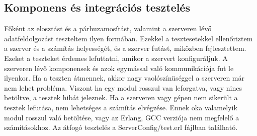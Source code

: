 \subsection{Komponens és integrációs tesztelés}
	Főként az elosztást és a párhuzamosítást, valamint a szerveren lévő adatfeldolgozást teszteltem ilyen formában. Ezekkel a tesztesetekkel ellenőriztem a szerver és a számítás helyességét, és a szerver futást, miközben fejlesztettem.\newline
	Ezeket a teszteket érdemes lefuttatni, amikor a szervert konfiguráljuk. A szerveren lévő komponensek és azok egymással való kommunikációja fut le ilyenkor. Ha a teszten átmennek, akkor nagy vaolószínüséggel a szerveren már nem lehet probléma.\newline
	Viszont ha egy modul rosszul van leforgatva, vagy nincs betöltve, a tesztek hibát jeleznek. Ha a szerveren vagy gépen nem sikerült a tesztek lefutása, nem lehetséges a számítás elvégzése. Ennek oka valamelyik modul rosszul való betöltése, vagy az Erlang, GCC verziója nem megfelelő a számításokhoz.\newline
	Az átfogó tesztelés a ServerConfig/test.erl fájlban található. 
